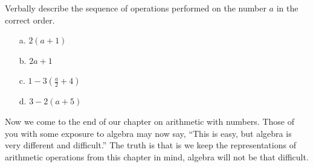 \begin{question} Verbally describe the sequence of operations performed on the number $a$ in the correct order.
\begin{enumerate}
\item[a.] $2(a+1)$
\item[b.] $2a+1$
\item[c.] $1-3\left(\frac{a}{2}+4\right)$
\item[d.] $3-2(a+5)$
\end{enumerate}
\end{question}

Now we come to the end of our chapter on arithmetic with numbers. Those of you with some exposure to algebra may now say, ``This is easy, but algebra is very different and difficult.'' The truth is that is we keep the representations of arithmetic operations from this chapter in mind, algebra will not be that difficult.
